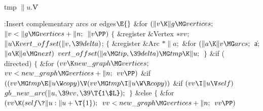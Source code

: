 \Y\B\4\D\\{tmp}\5
$\|u.{}$\|V%
\par
\Y\B\4:Insert complementary arcs or edges\X${}\E{}$\6
\&{for} ${}(\|v\K\|g\MG\\{vertices};{}$ ${}\|v<\|g\MG\\{vertices}+\|n;{}$ ${}%
\|v\PP){}$\5
${}\{{}$\5
\1\&{register} \&{Vertex} ${}{*}\\{vv};{}$\7
${}\|u\K\\{vert\_offset}(\|v,\39\\{delta}){}$;\6
${}\{{}$\5
\1\&{register} \&{Arc} ${}{*}\|a;{}$\7
\&{for} ${}(\|a\K\|v\MG\\{arcs};{}$ \|a; ${}\|a\K\|a\MG\\{next}){}$\1\5
${}\\{vert\_offset}(\|a\MG\\{tip},\39\\{delta})\MG\\{tmp}\K\|u;{}$\2\6
\4${}\}{}$\2\6
\&{if} (\\{directed})\5
${}\{{}$\1\6
\&{for} ${}(\\{vv}\K\\{new\_graph}\MG\\{vertices};{}$ ${}\\{vv}<\\{new\_graph}%
\MG\\{vertices}+\|n;{}$ ${}\\{vv}\PP){}$\1\6
\&{if} ${}((\\{vv}\MG\\{tmp}\E\|u\W\\{copy})\V(\\{vv}\MG\\{tmp}\I\|u\W\R%
\\{copy})){}$\1\6
\&{if} ${}(\\{vv}\I\|u\V\\{self}){}$\1\5
${}\\{gb\_new\_arc}(\|u,\39\\{vv},\39\T{1\$L});{}$\2\2\2\6
\4${}\}{}$\5
\2\&{else}\5
${}\{{}$\1\6
\&{for} ${}(\\{vv}\K(\\{self}\?\|u:\|u+\T{1});{}$ ${}\\{vv}<\\{new\_graph}\MG%
\\{vertices}+\|n;{}$ ${}\\{vv}\PP){}$\1\6
